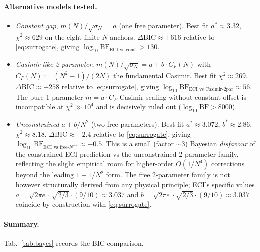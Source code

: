 \documentclass[11pt,a4paper,reqno]{amsart}
\theoremstyle{definition}
\begin{document}
\paragraph{Alternative models tested.}
\begin{itemize}[leftmargin=2em]
   \item \emph{Constant gap}, $m(N)/\sqrt{\sigma_N} = a$ (one free
         parameter). Best fit $a^*\approx 3.32$, $\chi^2 \approx
         629$ on the eight finite-$N$ anchors. $\Delta\text{BIC} \approx
         +616$ relative to \eqref{eq:surrogate}, giving
         $\log_{10}\text{BF}_{\text{ECI vs const}} > 130$.
   \item \emph{Casimir-like 2-parameter}, $m(N)/\sqrt{\sigma_N} = a +
         b\cdot C_F(N)$ with $C_F(N) := (N^2-1)/(2N)$ the fundamental
         Casimir. Best fit $\chi^2 \approx 269$. $\Delta\text{BIC}
         \approx +258$ relative to \eqref{eq:surrogate}, giving
         $\log_{10}\text{BF}_{\text{ECI vs Casimir-2par}} \approx 56$.
         The pure 1-parameter $m = a\cdot C_F$ Casimir
         scaling without constant offset is incompatible at
         $\chi^2 \gg 10^4$ and is decisively ruled out
         ($\log_{10}\text{BF} > 8000$).
   \item \emph{Unconstrained $a + b/N^2$} (two free parameters).
         Best fit $a^*\approx 3.072$, $b^*\approx 2.86$, $\chi^2
         \approx 8.18$. $\Delta\text{BIC}\approx -2.4$ relative to
         \eqref{eq:surrogate}, giving
         $\log_{10}\text{BF}_{\text{ECI vs free-} N^{-2}}\approx
         -0.5$. This is a small (factor $\sim 3$) Bayesian
         \emph{disfavour} of the constrained ECI prediction vs the
         unconstrained 2-parameter family, reflecting the slight
         empirical room for higher-order $O(1/N^4)$ corrections
         beyond the leading $1+1/N^2$ form. The free 2-parameter
         family is not however structurally derived from any
         physical principle; ECI's specific values $a = \sqrt{2\pi
         e}\cdot\sqrt{2/3}\cdot (9/10) \approx 3.037$ and
         $b = \sqrt{2\pi e}\cdot\sqrt{2/3}\cdot(9/10) \approx 3.037$
         coincide by construction with \eqref{eq:surrogate}.
\end{itemize}

\paragraph{Summary.}
Tab.~\ref{tab:bayes} records the BIC comparison.
\end{document}
